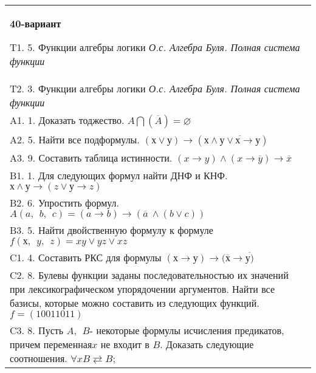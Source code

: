 \documentclass{article}
\begin{document}
\begin{tabular}{m{17cm}}
\textbf{40-вариант}
\newline

T1. 5. Функции алгебры логики \emph{О.с. Алгебра Буля. Полная система функции} \\
T2. 3. Функции алгебры логики \emph{О.с. Алгебра Буля. Полная система функции} \\
A1. 1. Доказать тоджество. \(A\bigcap(\overline{A}) = \varnothing\) \\
A2. 5. Найти все подформулы. \((х \vee у) \rightarrow \left( х \land \overline{у \vee х \rightarrow у} \right)\) \\
A3. 9. Составить таблица истинности. \((x \rightarrow y) \land (x \rightarrow \overline{y}) \rightarrow \overline{x}\) \\
B1. 1. Для следующих формул найти ДНФ и КНФ. \(х \land у \rightarrow (z \vee у \rightarrow z)\) \\
B2. 6. Упростить формул. \(A(a,\ \ b,\ \ c) = (a \rightarrow b) \rightarrow (\overline{a}\  \land (b \vee c))\) \\
B3. 5. Найти двойственную формулу к формуле \(f(х,\ \ y,\ \ z) = xy \vee yz \vee xz\) \\
C1. 4. Составить РКС для формулы \((х \rightarrow у) \rightarrow (\overline{х} \rightarrow \overline{у)}\) \\
C2. 8. Булевы функции заданы последовательностью их значений при лексикографическом упорядочении аргументов. Найти все базисы, которые можно составить из следующих функций. \(f = (10011011)\) \\
C3. 8. Пусть \(A,\ \ B\)- некоторые формулы исчисления предикатов, причем переменная\(x\) не входит в \(B\). Доказать следующие соотношения. \(\forall xB \rightleftarrows B\); \\

\end{tabular}
\vspace{1cm}
\end{document}
